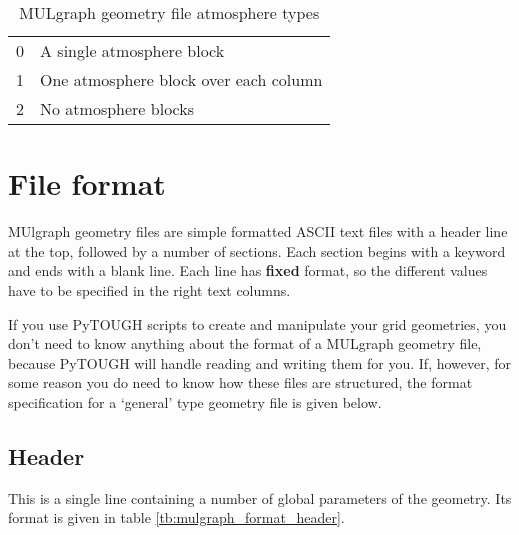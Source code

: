 \begin{table}[h]
  \begin{center}
    \begin{tabular}{|l|p{85mm}|}
      \hline
      0 & A single atmosphere block \\
      1 & One atmosphere block over each column \\
      2 & No atmosphere blocks \\
      \hline
    \end{tabular}
    \caption{MULgraph geometry file atmosphere types}
    \label{tb:mulgrid_atmosphere_types}
  \end{center}
\end{table}

\section{File format}
MUlgraph geometry files are simple formatted ASCII text files with a header line at the top, followed by a number of sections. Each section begins with a keyword and ends with a blank line. Each line has \textbf{fixed} format, so the different values have to be specified in the right text columns.

If you use PyTOUGH scripts to create and manipulate your grid geometries, you don't need to know anything about the format of a MULgraph geometry file, because PyTOUGH will handle reading and writing them for you. If, however, for some reason you do need to know how these files are structured, the format specification for a `general' type geometry file is given below.

\subsection{Header}

This is a single line containing a number of global parameters of the geometry. Its format is given in table \ref{tb:mulgraph_format_header}.

